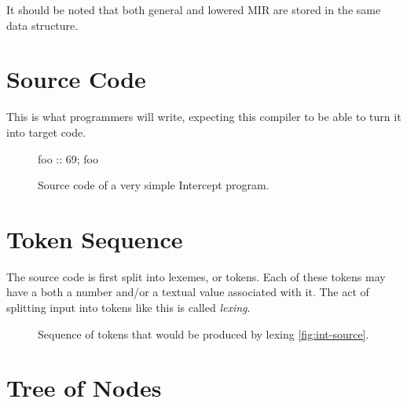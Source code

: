 \documentclass[12pt]{article}
\begin{document}
It should be noted that both general and lowered MIR are stored in the same data structure.

\section{Source Code}
\label{sec:source-code}

This is what programmers will write, expecting this compiler to be able to turn it into target code.

\begin{figure}[h]
  \centering
  foo :: 69; foo
  \caption{Source code of a very simple Intercept program.}
  \label{fig:int-source}
\end{figure}
\FloatBarrier

\section{Token Sequence}
\label{sec:tokens}

The source code is first split into lexemes, or tokens. Each of these tokens may have a both a number and/or a textual value associated with it. The act of splitting input into tokens like this is called \emph{lexing}.

\begin{figure}[h]
  \centering
  \caption{Sequence of tokens that would be produced by lexing \autoref{fig:int-source}.}
  \label{fig:int-tokens}
\end{figure}
\FloatBarrier

\section{Tree of Nodes}
\label{sec:node-tree}
\end{document}
